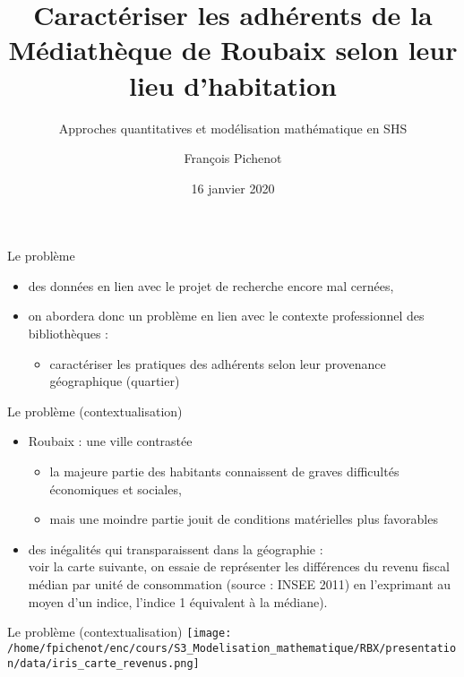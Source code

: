 \documentclass{beamer}
\title{Caractériser les adhérents de la Médiathèque de Roubaix selon leur lieu d'habitation}
\subtitle{Approches quantitatives et modélisation mathématique en SHS}
\author{François Pichenot}
\institute{Université Paris Sciences et Lettres - École nationale des chartes\\Master Humanités numériques et computationnelles}
\date{16 janvier 2020}
\begin{document}
\begin{frame}
	\titlepage
\end{frame}

\begin{frame}{Le problème}
	\begin{itemize}
    	\item des données en lien avec le projet de recherche encore mal cernées,
    	\item on abordera donc un problème en lien avec le contexte professionnel des bibliothèques :
    	\begin{itemize}
    		\item caractériser les pratiques des adhérents selon leur provenance géographique (quartier)
    	\end{itemize}
	\end{itemize}
\end{frame}

\begin{frame}{Le problème (contextualisation)}
	\begin{itemize}
    	\item Roubaix : une ville contrastée
    	\begin{itemize}
    		\item la majeure partie des habitants connaissent de graves difficultés économiques et sociales,
    		\item mais une moindre partie jouit de conditions matérielles plus favorables
    	\end{itemize}
    	\item des inégalités qui transparaissent dans la géographie :\\voir la carte suivante, on essaie de représenter les différences du revenu fiscal médian par unité de consommation (source : INSEE 2011) en l’exprimant au moyen d’un indice, l’indice 1 équivalent à la médiane).
	\end{itemize}
\end{frame}

\begin{frame}{Le problème (contextualisation)}
	\texttt{[image: /home/fpichenot/enc/cours/S3\_Modelisation\_mathematique/RBX/presentation/data/iris\_carte\_revenus.png]}
\end{frame}
\end{document}
